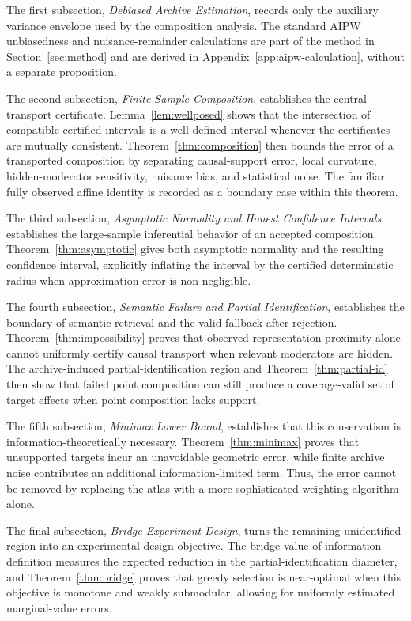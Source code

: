 \documentclass[11pt]{article}
\numberwithin{equation}{section}
\newcommand{\1}{\mathbf 1}
\begin{document}
The first subsection, \emph{Debiased Archive Estimation}, records only the auxiliary variance envelope used by the composition analysis.  The standard AIPW unbiasedness and nuisance-remainder calculations are part of the method in Section~\ref{sec:method} and are derived in Appendix~\ref{app:aipw-calculation}, without a separate proposition.

The second subsection, \emph{Finite-Sample Composition}, establishes the central transport certificate.  Lemma~\ref{lem:wellposed} shows that the intersection of compatible certified intervals is a well-defined interval whenever the certificates are mutually consistent.  Theorem~\ref{thm:composition} then bounds the error of a transported composition by separating causal-support error, local curvature, hidden-moderator sensitivity, nuisance bias, and statistical noise.  The familiar fully observed affine identity is recorded as a boundary case within this theorem.

The third subsection, \emph{Asymptotic Normality and Honest Confidence Intervals}, establishes the large-sample inferential behavior of an accepted composition.  Theorem~\ref{thm:asymptotic} gives both asymptotic normality and the resulting confidence interval, explicitly inflating the interval by the certified deterministic radius when approximation error is non-negligible.

The fourth subsection, \emph{Semantic Failure and Partial Identification}, establishes the boundary of semantic retrieval and the valid fallback after rejection.  Theorem~\ref{thm:impossibility} proves that observed-representation proximity alone cannot uniformly certify causal transport when relevant moderators are hidden.  The archive-induced partial-identification region and Theorem~\ref{thm:partial-id} then show that failed point composition can still produce a coverage-valid set of target effects when point composition lacks support.

The fifth subsection, \emph{Minimax Lower Bound}, establishes that this conservatism is information-theoretically necessary.  Theorem~\ref{thm:minimax} proves that unsupported targets incur an unavoidable geometric error, while finite archive noise contributes an additional information-limited term.  Thus, the error cannot be removed by replacing the atlas with a more sophisticated weighting algorithm alone.

The final subsection, \emph{Bridge Experiment Design}, turns the remaining unidentified region into an experimental-design objective.  The bridge value-of-information definition measures the expected reduction in the partial-identification diameter, and Theorem~\ref{thm:bridge} proves that greedy selection is near-optimal when this objective is monotone and weakly submodular, allowing for uniformly estimated marginal-value errors.
\end{document}
